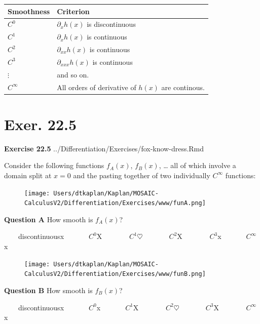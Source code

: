 \documentclass[
  letterpaper,
  DIV=11,
  numbers=noendperiod,
  oneside]{article}
\begin{document}
\begin{multicols}{2}
\begin{longtable}[]{@{}ll@{}}
\toprule()
Smoothness & Criterion \\
\midrule()
\endhead
\(C^0\) & \(\partial_x h(x)\) is discontinuous \\
\(C^1\) & \(\partial_x h(x)\) is continuous \\
\(C^2\) & \(\partial_{xx} h(x)\) is continuous \\
\(C^3\) & \(\partial_{xxx} h(x)\) is continuous \\
\(\vdots\) & and so on. \\
\(C^\infty\) & All orders of derivative of \(h(x)\) are continous. \\
\bottomrule()
\end{longtable}

\hypertarget{exer.-22.5}{%
\section*{Exer. 22.5}\label{exer.-22.5}}

\textbf{Exercise 22.5} ../Differentiation/Exercises/fox-know-dress.Rmd

Consider the following functions \(f_A(x)\), \(f_B(x)\), \ldots{} all of
which involve a domain split at \(x=0\) and the pasting together of two
individually \(C^\infty\) functions:

\begin{figure}

{\centering \texttt{[image: Users/dtkaplan/Kaplan/MOSAIC-CalculusV2/Differentiation/Exercises/www/funA.png]}

}

\end{figure}

\textbf{Question A} How smooth is \(f_A(x)\)?

~~~~{discontinuous{x}}~~~~~~~{\(C^0\){︎X
}}~~~~~~~{\(C^1\){\(\heartsuit\ \)}}~~~~~~~{\(C^2\){︎X
}}~~~~~~~{\(C^3\){x}}~~~~~~~{\(C^\infty\){x}}

\begin{figure}

{\centering \texttt{[image: Users/dtkaplan/Kaplan/MOSAIC-CalculusV2/Differentiation/Exercises/www/funB.png]}

}

\end{figure}

\textbf{Question B} How smooth is \(f_B(x)\)?

~~~~{discontinuous{x}}~~~~~~~{\(C^0\){x}}~~~~~~~{\(C^1\){︎X
}}~~~~~~~{\(C^2\){\(\heartsuit\ \)}}~~~~~~~{\(C^3\){︎X
}}~~~~~~~{\(C^\infty\){x}}


\end{multicols}
\end{document}
